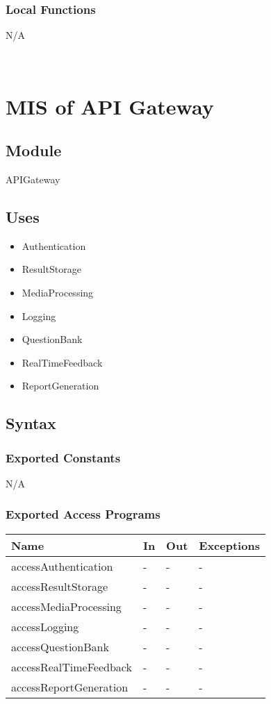 \documentclass[12pt, titlepage]{article}
\begin{document}
\subsubsection{Local Functions}
N/A

~\newpage
\section{MIS of API Gateway \label{mAppController} }

\subsection{Module}

APIGateway

\subsection{Uses}

\begin{itemize}
  \item Authentication
  \item ResultStorage
  \item MediaProcessing
  \item Logging
  \item QuestionBank
  \item RealTimeFeedback
  \item ReportGeneration
\end{itemize}

\subsection{Syntax}

\subsubsection{Exported Constants}

N/A

\subsubsection{Exported Access Programs}

\begin{center}
\begin{tabular}{p{8cm} p{4cm} p{2cm} p{2cm}}
\hline
\textbf{Name} & \textbf{In} & \textbf{Out} & \textbf{Exceptions} \\
\hline
accessAuthentication & - & - & - \\
accessResultStorage & - & - & - \\
accessMediaProcessing & - & - & - \\
accessLogging & - & - & - \\
accessQuestionBank & - & - & - \\
accessRealTimeFeedback & - & - & - \\
accessReportGeneration & - & - & - \\
\hline
\end{tabular}
\end{center}
\end{document}
